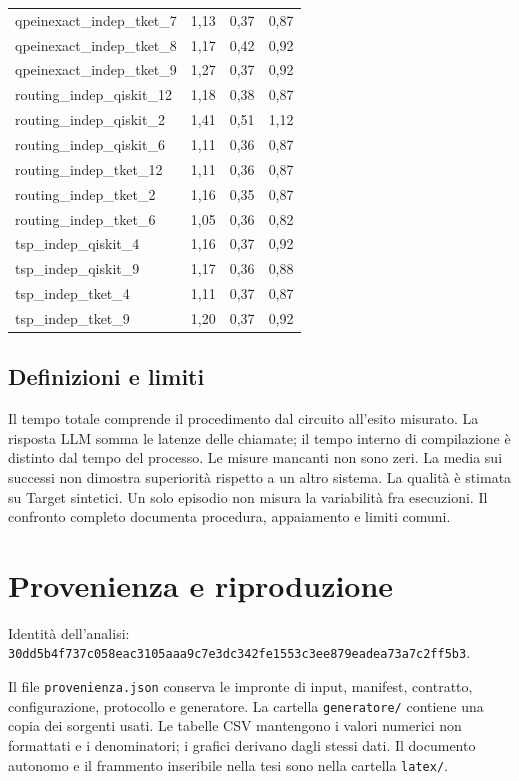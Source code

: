 \begin{longtable}{lrrr}
qpeinexact\_indep\_tket\_7 & 1,13 & 0,37 & 0,87 \\
qpeinexact\_indep\_tket\_8 & 1,17 & 0,42 & 0,92 \\
qpeinexact\_indep\_tket\_9 & 1,27 & 0,37 & 0,92 \\
routing\_indep\_qiskit\_12 & 1,18 & 0,38 & 0,87 \\
routing\_indep\_qiskit\_2 & 1,41 & 0,51 & 1,12 \\
routing\_indep\_qiskit\_6 & 1,11 & 0,36 & 0,87 \\
routing\_indep\_tket\_12 & 1,11 & 0,36 & 0,87 \\
routing\_indep\_tket\_2 & 1,16 & 0,35 & 0,87 \\
routing\_indep\_tket\_6 & 1,05 & 0,36 & 0,82 \\
tsp\_indep\_qiskit\_4 & 1,16 & 0,37 & 0,92 \\
tsp\_indep\_qiskit\_9 & 1,17 & 0,36 & 0,88 \\
tsp\_indep\_tket\_4 & 1,11 & 0,37 & 0,87 \\
tsp\_indep\_tket\_9 & 1,20 & 0,37 & 0,92 \\
\end{longtable}
\endgroup
\begin{samepage}\subsection{Definizioni e limiti}
Il tempo totale comprende il procedimento dal circuito all’esito misurato. La risposta LLM somma le latenze delle chiamate; il tempo interno di compilazione è distinto dal tempo del processo. Le misure mancanti non sono zeri. La media sui successi non dimostra superiorità rispetto a un altro sistema. La qualità è stimata su Target sintetici. Un solo episodio non misura la variabilità fra esecuzioni. Il confronto completo documenta procedura, appaiamento e limiti comuni.
\par\end{samepage}
\FloatBarrier\section{Provenienza e riproduzione}
Identità dell’analisi: \nolinkurl{30dd5b4f737c058eac3105aaa9c7e3dc342fe1553c3ee879eadea73a7c2ff5b3}.

Il file \texttt{provenienza.json} conserva le impronte di input, manifest, contratto, configurazione, protocollo e generatore. La cartella \texttt{generatore/} contiene una copia dei sorgenti usati. Le tabelle CSV mantengono i valori numerici non formattati e i denominatori; i grafici derivano dagli stessi dati. Il documento autonomo e il frammento inseribile nella tesi sono nella cartella \texttt{latex/}.

